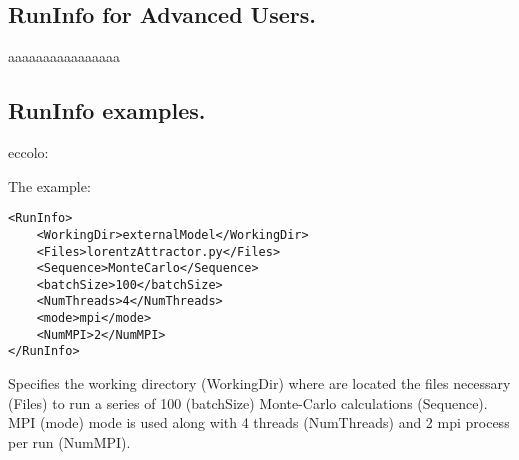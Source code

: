 \subsection{RunInfo for Advanced Users.}
\label{subsec:runinfoadvanced}
aaaaaaaaaaaaaaaa

\subsection{RunInfo examples.}
eccolo:

The example:
\begin{lstlisting}[style=XML]
<RunInfo>
    <WorkingDir>externalModel</WorkingDir>
    <Files>lorentzAttractor.py</Files>
    <Sequence>MonteCarlo</Sequence>
    <batchSize>100</batchSize>
    <NumThreads>4</NumThreads>    
    <mode>mpi</mode>
    <NumMPI>2</NumMPI>
</RunInfo>
\end{lstlisting}
Specifies the working directory (WorkingDir) where are located the files necessary (Files) to run a series of 100 (batchSize) Monte-Carlo calculations (Sequence).
MPI (mode) mode is used along with 4 threads (NumThreads) and 2 mpi process per run (NumMPI).

